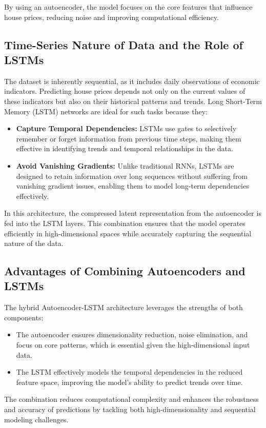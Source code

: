 By using an autoencoder, the model focuses on the core features that influence house prices, reducing noise and improving computational efficiency.

\subsection{Time-Series Nature of Data and the Role of LSTMs}

The dataset is inherently sequential, as it includes daily observations of economic indicators. Predicting house prices depends not only on the current values of these indicators but also on their historical patterns and trends. Long Short-Term Memory (LSTM) networks are ideal for such tasks because they:

\begin{itemize}
    \item \textbf{Capture Temporal Dependencies:} LSTMs use gates to selectively remember or forget information from previous time steps, making them effective in identifying trends and temporal relationships in the data.
    \item \textbf{Avoid Vanishing Gradients:} Unlike traditional RNNs, LSTMs are designed to retain information over long sequences without suffering from vanishing gradient issues, enabling them to model long-term dependencies effectively.
\end{itemize}

In this architecture, the compressed latent representation from the autoencoder is fed into the LSTM layers. This combination ensures that the model operates efficiently in high-dimensional spaces while accurately capturing the sequential nature of the data.

\subsection{Advantages of Combining Autoencoders and LSTMs}

The hybrid Autoencoder-LSTM architecture leverages the strengths of both components:

\begin{itemize}
    \item The autoencoder ensures dimensionality reduction, noise elimination, and focus on core patterns, which is essential given the high-dimensional input data.
    \item The LSTM effectively models the temporal dependencies in the reduced feature space, improving the model’s ability to predict trends over time.
\end{itemize}

The combination reduces computational complexity and enhances the robustness and accuracy of predictions by tackling both high-dimensionality and sequential modeling challenges.